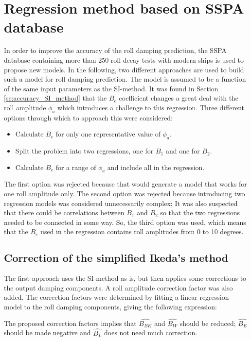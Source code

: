 \section{Regression method based on SSPA database}
\label{se:correction_SI_method}
In order to improve the accuracy of the roll damping prediction, the SSPA database containing more than 250 roll decay tests with modern ships is used to propose new models. In the following, two different approaches are used to build such a model for roll damping prediction. The model is assumed to be a function of the same input parameters as the SI-method. It was found in Section \ref{se:accuracy_SI_method} that the $B_e$ coefficient changes a great deal  with the roll amplitude $\phi_a$ which introduces a challenge to this regression. Three different options through which to approach this were considered:
\begin{itemize}
    \item Calculate $B_e$ for only one representative value of $\phi_a$.
    \item Split the problem into two regressions, one for $B_1$ and one for $B_2$.
    \item Calculate $B_e$ for a range of $\phi_a$ and include all in the regression.
\end{itemize}
The first option was rejected because that would generate a model that works for one roll amplitude only. The second option was rejected because introducing two regression models was considered unnecessarily complex; It was also suspected that there could be correlations between $B_1$ and $B_2$ so that the two regressions needed to be connected in some way. So, the third option was used, which means that the $B_e$ used in the regression contains roll amplitudes from 0 to 10 degrees.  

\subsection{Correction of the simplified Ikeda's method}
The first approach uses the SI-method as is, but then applies some corrections to the output damping components. A roll amplitude correction factor was also added. The correction factors were determined by fitting a linear regression model to the roll damping components, giving the following expression: 

The proposed correction factors implies that $\hat{B_{BK}}$ and $\hat{B_{W}}$ should be reduced; $\hat{B_{E}}$ should be made negative and $\hat{B_{L}}$ does not need much correction.


